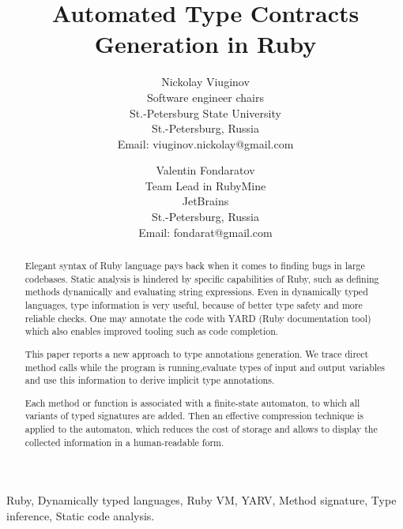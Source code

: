 \documentclass[conference]{IEEEtran}
\begin{document}
\title{Automated Type Contracts Generation in Ruby}
\author
{
    \IEEEauthorblockN
    {
        Nickolay Viuginov 
    }
    
    \IEEEauthorblockA
    {
        Software engineer chairs\\
        St.-Petersburg State University\\
        St.-Petersburg, Russia\\
        Email: viuginov.nickolay@gmail.com
    }
    \and
    \IEEEauthorblockN
    {
        Valentin Fondaratov 
    }
    
    \IEEEauthorblockA
    {
        Team Lead in RubyMine\\
        JetBrains\\
        St.-Petersburg, Russia\\
        Email: fondarat@gmail.com
    }

}
\maketitle

\begin{abstract}
  Elegant syntax of Ruby language pays back when it comes to finding bugs in large codebases. Static analysis is
  hindered\cite{ruby_type_checker} by specific capabilities of Ruby, such as defining methods dynamically and evaluating string expressions. 
  Even in dynamically typed languages, type information is very useful, because of better type safety and more reliable checks.
  One may annotate the code with YARD (Ruby documentation tool) which also enables improved tooling such as code completion.



This paper reports a new approach to type annotations generation. We trace direct method calls while the program is running,evaluate types of input and output variables and use this information to derive implicit type annotations.

Each method or function is associated with a finite-state automaton, to which all variants of typed signatures are added. Then an effective compression technique is applied to the automaton, which reduces the cost of storage and allows to display the collected information in a human-readable form.
 
\end{abstract}

\begin{IEEEkeywords}
Ruby, Dynamically typed languages, Ruby VM, YARV, Method signature, Type inference, Static code analysis.
\end{IEEEkeywords}
\IEEEpeerreviewmaketitle
\end{document}
